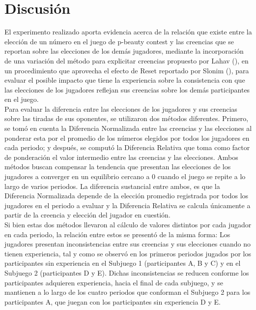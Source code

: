 
\chapter{Discusión} %

\label{Cap_Disc} %

El experimento realizado aporta evidencia acerca de la relación que existe entre la elección de un número en el juego de p-beauty contest y las creencias que se reportan sobre las elecciones de los demás jugadores, mediante la incorporación de una variación del método para explicitar creencias propuesto por Lahav (\citeyear{Lahav}), en un procedimiento que aprovecha el efecto de Reset reportado por Slonim (\citeyear{Slonim}), para evaluar el posible impacto que tiene la experiencia sobre la consistencia con que las elecciones de los jugadores reflejan sus creencias sobre los demás participantes en el juego. \\

Para evaluar la diferencia entre las elecciones de los jugadores y sus creencias sobre las tiradas de sus oponentes, se utilizaron dos métodos diferentes. Primero, se tomó en cuenta la Diferencia Normalizada entre las creencias y las elecciones al ponderar esta por el promedio de los números elegidos por todos los jugadores en cada periodo; y después, se computó la Diferencia Relativa que toma como factor de ponderación el valor intermedio entre las creencias y las elecciones. Ambos métodos buscan compensar la tendencia que presentan las elecciones de los jugadores a converger en un equilibrio cercano a 0 cuando el juego se repite a lo largo de varios periodos. La diferencia sustancial entre ambos, es que la Diferencia Normalizada depende de la elección promedio registrada por todos los jugadores en el periodo a evaluar y la Diferencia Relativa se calcula únicamente a partir de la creencia y elección del jugador en cuestión.\\

Si bien estas dos métodos llevaron al cálculo de valores distintos por cada jugador en cada periodo,  la relación entre estos se presentó de la misma forma: Los jugadores presentan inconsistencias entre sus creencias y sus elecciones cuando no tienen experiencia, tal y como se observó en los primeros periodos jugados por los participantes sin experiencia en el Subjuego 1 (participantes A, B y C) y en  el Subjuego 2 (participantes D y E). Dichas inconsistencias se reducen conforme los participantes adquieren experiencia, hacia el final de cada subjuego, y se mantienen a lo largo de los cuatro periodos que conforman el Subjuego 2 para los participantes A, que juegan con los participantes sin experiencia D y E.\\


